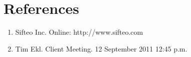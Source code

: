 \documentclass[12pt]{article}
\begin{document}
\clearpage
{}
\printglossaries
\clearpage

\section*{References}

        \begin{enumerate}
                \item{Sifteo Inc. Online: http://www.sifteo.com}
                \item{Tim Ekl.  Client Meeting.  12 September 2011 12:45 p.m.}
        \end{enumerate}

\clearpage

\printindex
\end{document}
